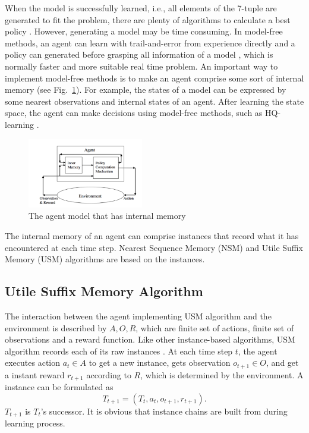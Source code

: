 \documentclass[conference]{IEEEtran}
\begin{document}
	When the model is successfully learned, i.e., all elements of the 7-tuple are
	generated to fit the problem, there are plenty of algorithms to calculate a best
	policy \cite{shani2013survey}. However, generating a model may be time consuming.
	In model-free methods, an agent can learn with trail-and-error from experience directly
	and a policy can generated before grasping all information of a model \cite{li2017deep},
	which is normally faster and more suitable real time problem. An important way to implement model-free
	methods is to make an agent comprise some sort of internal memory \cite{aberdeen2003policy,
	meuleau1999learning, mccallum1995instance} (see Fig.~\ref{fig:agent memory}).
	For example, the states of a model can be expressed by some nearest observations
	and internal states of an agent. After learning the state space, the agent can make
	decisions using model-free methods, such as HQ-learning \cite{wiering1997hq}.
	
	\begin{figure}[b]
		\centering
		\includegraphics[width=0.45\textwidth]{agent_with_memory.png}
		\caption{The agent model that has internal memory}
		\label{fig:agent memory}
	\end{figure}
	
	The internal memory of an agent can comprise instances that record what it has
	encountered at each time step. Nearest Sequence Memory (NSM) and Utile
	Suffix Memory (USM) algorithms are based on the instances.
	
	
	\subsection{Utile Suffix Memory Algorithm}
	
	The interaction between the agent implementing USM algorithm and the environment is described by
	$A, O, R$, which are finite set of actions, finite set of observations and a reward function.
	Like other instance-based algorithms, USM algorithm records each of its raw instances
	\cite{mccallum1995instance}. At each time step $t$, the agent executes action
	$a_t \in A$ to get a new instance, gets observation $o_{t+1} \in O$, and get a
	instant reward $r_{t+1}$ according to $R$, which is determined by the environment.
	A instance can be formulated as
	\begin{equation}
	T_{t+1}= (T_t, a_t, o_{t+1}, r_{t+1}). \label{equ:instance}
	\end{equation}
	$T_{t+1}$ is $T_t$'s successor. It is obvious that instance chains are built
	from during learning process.
	
\end{document}
